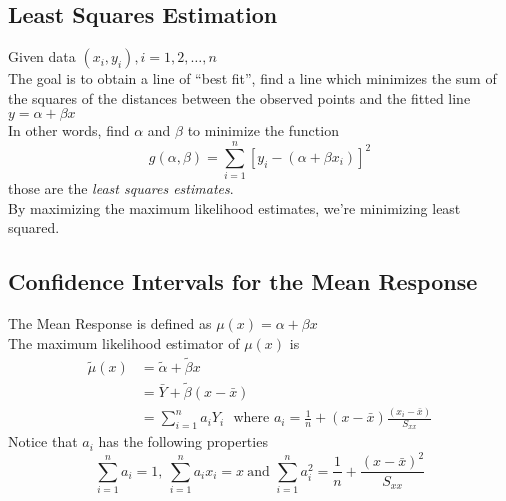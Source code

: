 \documentclass[12pt]{article}
\theoremstyle{definition}
\begin{document}
  \subsection{Least Squares Estimation}
  Given data $(x_{i}, y_{i}), i = 1, 2, \dots, n$ \\
  The goal is to obtain a line of ``best fit'', find a line which minimizes the sum of the squares of the distances between the observed points and the fitted line $y = \alpha + \beta x$ \\
  In other words, find $\alpha$ and $\beta$ to minimize the function
  $$g(\alpha, \beta) = \sum_{i=1}^{n}[y_{i} - (\alpha + \beta x_{i})]^{2}$$
  those are the \emph{least squares estimates}. \\
  By maximizing the maximum likelihood estimates, we're minimizing least squared.

  \subsection{Confidence Intervals for the Mean Response}
  The Mean Response is defined as $\mu(x) = \alpha + \beta x$ \\
  The maximum likelihood estimator of $\mu(x)$ is
  \begin{align*}
  \widetilde{\mu}(x) &= \widetilde{\alpha} + \widetilde{\beta}x \\
  &= \bar{Y} + \widetilde{\beta}(x - \bar{x}) \\
  &= \sum_{i=1}^{n}a_{i}Y_{i} ~~~\text{where } a_{i} = \frac{1}{n} + (x - \bar{x})\frac{(x_{i} - \bar{x})}{S_{xx}}
  \end{align*}
  Notice that $a_{i}$ has the following properties
  $$\sum_{i=1}^{n}a_{i} = 1, ~\sum_{i=1}^{n}a_{i}x_{i} = x ~\text{and } \sum_{i=1}^{n}a_{i}^{2} = \frac{1}{n} + \frac{(x - \bar{x})^{2}}{S_{xx}}$$
\end{document}
